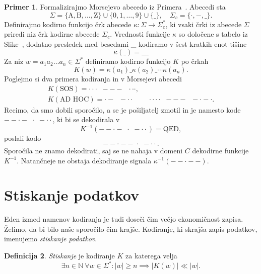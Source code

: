 \documentclass{amsart}
\newcommand{\N}{\mathbb{N}}
\theoremstyle{definition} %
\newtheorem{definicija}{Definicija}[section]
\newtheorem{primer}[definicija]{Primer}
\theoremstyle{plain} %
\begin{document}
\begin{primer}
    
    Formalizirajmo Morsejevo abecedo iz Primera~. Abecedi sta
    \[
        \Sigma = \{ \text{A},  \text{B}, \ldots, \text{Z} \} \cup \{ 0, 1, \ldots, 9 \} \cup \{ \_ \}, \quad
        \Sigma_c = \{ \cdot ,-, \_ \}.
    \]
    Definirajmo kodirno funkcijo črk abecede $ \kappa \colon \Sigma \to \Sigma_c^* $, ki vsaki črki iz abecede
    $ \Sigma $ priredi niz črk kodirne abecede $ \Sigma_c $. Vrednosti funkcije $ \kappa $ so določene s
    tabelo iz Slike~, dodatno presledek med besedami \_  kodiramo v šest kratkih enot tišine 
    \[
        \kappa(\_) = \_\_\_
    \]
    Za niz $ w = a_1a_2 \ldots a_n \in \Sigma^* $ definiramo kodirno 
    funkcijo $ K $ po črkah
    \[
        K(w) = \kappa(a_1)\_\kappa(a_2)\_\cdots\kappa(a_n).
    \]
    Poglejmo si dva primera kodiranja in v Morsejevi abecedi
    \begin{gather*}
        K(\text{SOS}) = \cdot\cdot\cdot \;\; --- \;\; \cdot\cdot\cdot, \\
        K(\text{AD HOC}) = \cdot- \;\; -\cdot\cdot \qquad \cdot\cdot\cdot\cdot \;\; --- \;\; -\cdot-\cdot.
    \end{gather*}
    Recimo, da smo dobili sporočilo, a se je pošiljatelj zmotil in je namesto kode 
    $ --\cdot- \,\, \cdot \,\, -\cdot\cdot $, ki bi se dekodirala v
    \[
        K^{-1}(--\cdot- \,\, \cdot \,\, -\cdot\cdot) = \text{QED},
        \]
    poslali kodo
    \[
        --\cdot-- \,\, \cdot \,\, -\cdot\cdot.
    \]
    Sporočila ne znamo dekodirati, saj se ne nahaja v domeni $ C $ dekodirne funkcije $ K^{-1} $.
    Natančneje ne obstaja dekodiranje signala $ \kappa^{-1}(--\cdot--) $.

\end{primer}

\section{Stiskanje podatkov}

Eden izmed namenov kodiranja je tudi doseči čim večjo ekonomičnost zapisa. Želimo, da bi bilo naše sporočilo
čim krajše. Kodiranje, ki skrajša zapis podatkov, imenujemo \textit{stiskanje podatkov}.

\begin{definicija}
    
    \textit{Stiskanje} je kodiranje $ K $ za katerega velja 
    \[ 
    \exists n \in \N \ \forall w \in \Sigma^* \colon |w| \geq n \implies
    \left\lvert K(w)\right\rvert \ll \left\lvert w \right\rvert.
    \]

\end{definicija}
\end{document}

